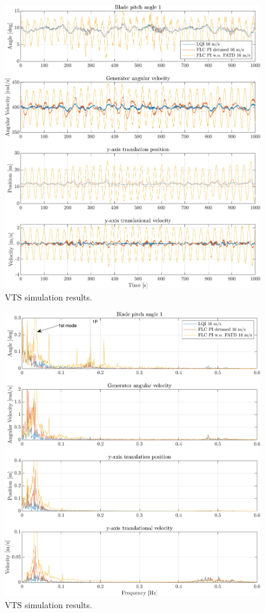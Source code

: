 \begin{figure}[ht]
	\centering
	\includegraphics[width=0.7\linewidth]{Graphics/TestResults/VTSplotting/3_th_w_py_vy.png}
	\caption{VTS simulation results.}
	\label{fig:vts_3_th_w_py_vy}
\end{figure}

\begin{figure}[ht]
	\centering
	\includegraphics[width=0.7\linewidth]{Graphics/TestResults/VTSplotting/4_fft_th_w_py_vy.png}
	\caption{VTS simulation results.}
	\label{fig:vts_4_fft_th_w_py_vy}
\end{figure}

